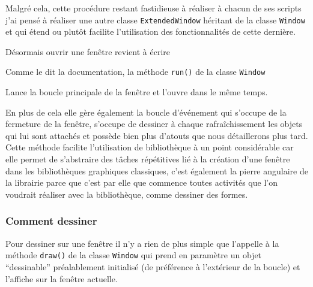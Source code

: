 \documentclass[11pt,a4paper,krantz2,11pt,oneside]{krantz}
\newenvironment{Shaded}{\begin{snugshade}}{\end{snugshade}}
\newcommand{\DecValTok}[1]{\textcolor[rgb]{0.06,0.06,0.06}{#1}}
\newcommand{\KeywordTok}[1]{\textcolor[rgb]{0.27,0.27,0.27}{\textbf{#1}}}
\newcommand{\NormalTok}[1]{#1}
\newcommand{\OtherTok}[1]{\textcolor[rgb]{0.37,0.37,0.37}{#1}}
\renewenvironment{quote}{\begin{VF}}{\end{VF}}
\begin{document}
Malgré cela, cette procédure restant fastidieuse à réaliser à chacun de ses scripts j'ai pensé à réaliser une autre classe \texttt{ExtendedWindow} héritant de la classe \texttt{Window} et qui étend ou plutôt facilite l'utilisation des fonctionnalités de cette dernière.

Désormais ouvrir une fenêtre revient à écrire

\begin{Shaded}
\end{Shaded}

Comme le dit la documentation, la méthode \texttt{run()} de la classe \texttt{Window}

\begin{quote}
Lance la boucle principale de la fenêtre et l'ouvre dans le même temps.
\end{quote}

En plus de cela elle gère également la boucle d'événement qui s'occupe de la fermeture de la fenêtre, s'occupe de dessiner à chaque rafraîchissement les objets qui lui sont attachés et possède bien plus d'atouts que nous détaillerons plus tard. Cette méthode facilite l'utilisation de bibliothèque à un point considérable car elle permet de s'abstraire des tâches répétitives lié à la création d'une fenêtre dans les bibliothèques graphiques classiques, c'est également la pierre angulaire de la librairie parce que c'est par elle que commence toutes activités que l'on voudrait réaliser avec la bibliothèque, comme dessiner des formes.

\hypertarget{comment-dessiner}{%
\subsubsection{Comment dessiner}\label{comment-dessiner}}

Pour dessiner sur une fenêtre il n'y a rien de plus simple que l'appelle à la méthode \texttt{draw()} de la classe \texttt{Window} qui prend en paramètre un objet ``dessinable'' préalablement initialisé (de préférence à l'extérieur de la boucle) et l'affiche sur la fenêtre actuelle.
\end{document}

